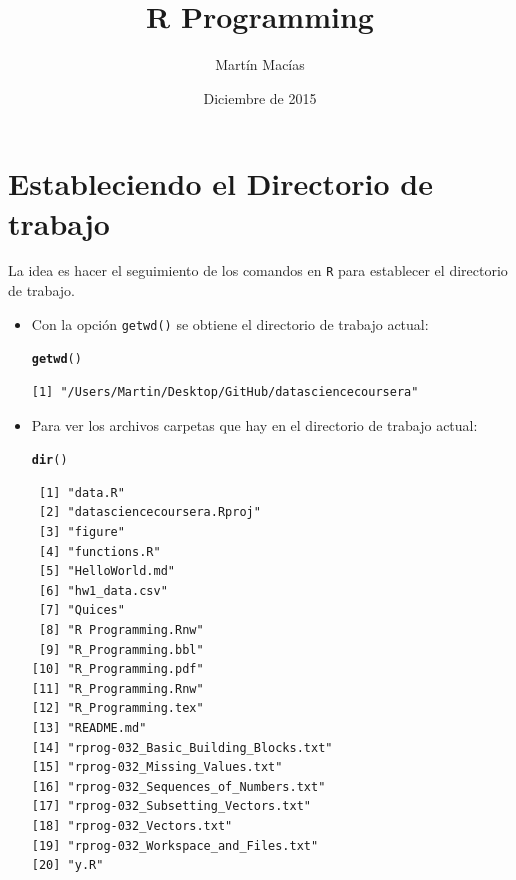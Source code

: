 \documentclass{article}\usepackage[]{graphicx}\usepackage[]{color}
\title{R Programming}
\author{Martín Macías}
\date{Diciembre de 2015}
\makeatletter
\newcommand{\hlstd}[1]{\textcolor[rgb]{0.345,0.345,0.345}{#1}}%
\newcommand{\hlkwd}[1]{\textcolor[rgb]{0.737,0.353,0.396}{\textbf{#1}}}%
\newenvironment{kframe}{%
 \def\at@end@of@kframe{}%
 \ifinner\ifhmode%
  \def\at@end@of@kframe{\end{minipage}}%
  \begin{minipage}{\columnwidth}%
 \fi\fi%
 \def\FrameCommand##1{\hskip\@totalleftmargin \hskip-\fboxsep
 \colorbox{shadecolor}{##1}\hskip-\fboxsep
     \hskip-\linewidth \hskip-\@totalleftmargin \hskip\columnwidth}%
 \MakeFramed {\advance\hsize-\width
   \@totalleftmargin\z@ \linewidth\hsize
   \@setminipage}}%
 {\par\unskip\endMakeFramed%
 \at@end@of@kframe}
\newenvironment{knitrout}{}{} %
\makeatother
\begin{document}
\maketitle

\section{Estableciendo el Directorio de trabajo}
La idea es hacer el seguimiento de los comandos en \texttt{R} para establecer el directorio de trabajo.\\
\begin{itemize}
  \item Con la opción \texttt{getwd()} se obtiene el directorio de trabajo actual:
\begin{knitrout}
\color{fgcolor}\begin{kframe}
\begin{alltt}
  \hlkwd{getwd}\hlstd{()}
\end{alltt}
\begin{verbatim}
[1] "/Users/Martin/Desktop/GitHub/datasciencecoursera"
\end{verbatim}
\end{kframe}
\end{knitrout}

  \item Para ver los archivos  carpetas que hay en el directorio de trabajo actual:
\begin{knitrout}
\color{fgcolor}\begin{kframe}
\begin{alltt}
  \hlkwd{dir}\hlstd{()}
\end{alltt}
\begin{verbatim}
 [1] "data.R"                             
 [2] "datasciencecoursera.Rproj"          
 [3] "figure"                             
 [4] "functions.R"                        
 [5] "HelloWorld.md"                      
 [6] "hw1_data.csv"                       
 [7] "Quices"                             
 [8] "R Programming.Rnw"                  
 [9] "R_Programming.bbl"                  
[10] "R_Programming.pdf"                  
[11] "R_Programming.Rnw"                  
[12] "R_Programming.tex"                  
[13] "README.md"                          
[14] "rprog-032_Basic_Building_Blocks.txt"
[15] "rprog-032_Missing_Values.txt"       
[16] "rprog-032_Sequences_of_Numbers.txt" 
[17] "rprog-032_Subsetting_Vectors.txt"   
[18] "rprog-032_Vectors.txt"              
[19] "rprog-032_Workspace_and_Files.txt"  
[20] "y.R"                                
\end{verbatim}
\end{kframe}
\end{knitrout}


\end{itemize}
\end{document}
